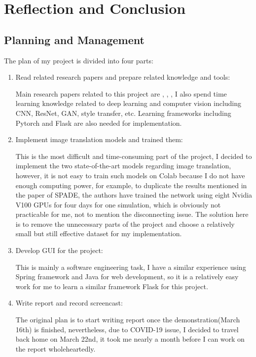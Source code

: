 \chapter{Reflection and Conclusion}
\section{Planning and Management}
The plan of my project is divided into four parts:
\begin{enumerate}
    \item Read related research papers and prepare related knowledge and tools:
    
    Main research papers related to this project are \cite{pix2pix2016}, \cite{wang2018pix2pixHD},
    \cite{park2019SPADE}, I also spend time learning knowledge related to deep 
    learning and computer vision including CNN, ResNet, GAN, style transfer, etc. 
    Learning frameworks including Pytorch and Flask are also needed for implementation.
    \item Implement image translation models and trained them:
    
    This is the most difficult and time-consuming part of the project, I decided to implement 
    the two state-of-the-art models regarding image translation, however, it is not easy to 
    train such models on Colab because I do not have enough computing power, for example, 
    to duplicate the results mentioned in the paper of SPADE, the authors have trained the 
    network using eight Nvidia V100 GPUs for four days for one simulation, which is obviously 
    not practicable for me, not to mention the disconnecting issue. The solution here is to remove the unnecessary parts of 
    the project and choose a relatively small but still effective dataset for my implementation.
    \item Develop GUI for the project: 
    
    This is mainly a software engineering task, I have a similar experience using Spring framework 
    and Java for web development, so it is a relatively easy work for me to learn a similar 
    framework Flask for this project.
    \item Write report and record screencast: 
    
    The original plan is to start writing report once the demonstration(March 16th) is finished, 
    nevertheless, due to COVID-19 issue, I decided to travel back home on March 22nd, it took me 
    nearly a month before I can work on the report wholeheartedly.
\end{enumerate}

